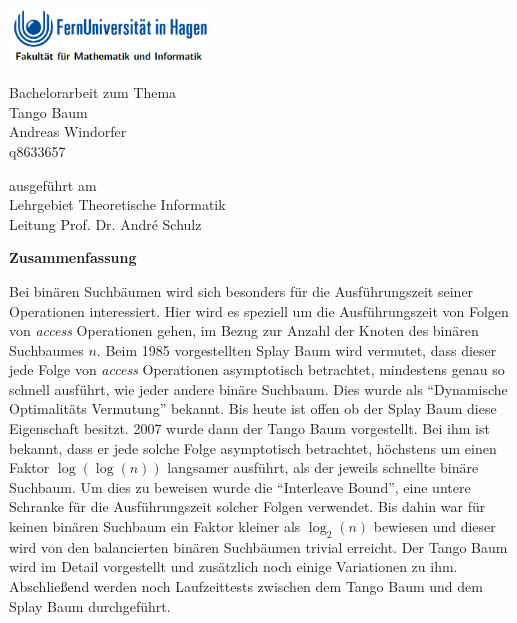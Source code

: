 \documentclass[a4paper,12pt]{article}
\begin{document}
\begin{center}
\includegraphics[width= 0.4\textwidth]{"Medien/kleinkram/UniLogo"}
\end{center}
\bigskip


 \begin{center}
 	\LARGE{Bachelorarbeit zum Thema\\
 	Tango Baum}\\
 \bigskip
 \bigskip
 \bigskip
 \bigskip
\bigskip
\bigskip 
\bigskip
\bigskip
 \large{
 Andreas Windorfer\\
 q8633657}
 \end{center}
 \bigskip
 \bigskip
 \bigskip
 \bigskip 
 \bigskip
 \bigskip
 \bigskip 
  \bigskip 
 \bigskip
 \bigskip
 \bigskip 
  \begin{center}
 ausgeführt am\\
 Lehrgebiet Theoretische Informatik\\
 Leitung Prof. Dr. André Schulz\\
\end{center}

\author{Andreas Windorfer}





\newpage
\begin{center}
\textbf{Zusammenfassung}
\end{center}
 Bei binären Suchbäumen wird sich besonders für die Ausführungszeit seiner Operationen  interessiert. Hier wird es speziell um die Ausführungszeit von Folgen von \textit{access} Operationen gehen, im Bezug zur Anzahl der Knoten des binären Suchbaumes $n$. Beim 1985  vorgestellten Splay Baum \cite{splay} wird vermutet, dass dieser jede Folge von  \textit{access} Operationen asymptotisch betrachtet, mindestens genau so schnell ausführt, wie jeder andere binäre Suchbaum. Dies wurde als \enquote{Dynamische Optimalitäts Vermutung} bekannt. Bis heute ist offen ob der Splay Baum diese Eigenschaft besitzt.  2007 wurde dann der Tango Baum  \cite{demainDinamicOpti} vorgestellt. Bei ihm ist bekannt, dass er jede solche Folge asymptotisch betrachtet, höchstens um einen Faktor $\log\left(\log\left(n\right)\right)$ langsamer ausführt, als der jeweils schnellte binäre Suchbaum. Um dies zu beweisen wurde die \enquote{Interleave Bound}, eine untere Schranke für die Ausführungszeit solcher Folgen verwendet.  Bis dahin war für keinen binären Suchbaum ein Faktor kleiner als $\log_2\left(n\right)$ bewiesen und dieser wird von den balancierten binären Suchbäumen trivial erreicht. Der Tango Baum wird im Detail vorgestellt und zusätzlich noch einige Variationen zu ihm. Abschließend werden noch Laufzeittests zwischen dem Tango Baum und dem Splay Baum durchgeführt. 
\newpage
\tableofcontents
\newpage
\end{document}
